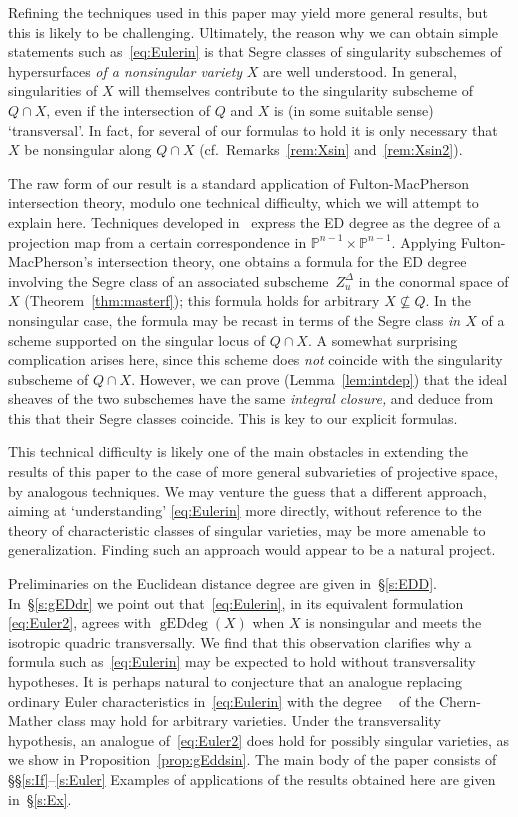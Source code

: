 \documentclass[11pt]{amsart}
\numberwithin{equation}{section}
\newcommand{\Pbb}{{\mathbb{P}}}
\DeclareMathOperator{\gEdd}{gEDdeg}
\DeclareMathOperator{\chima}{\chi_\text{Ma}}
\begin{document}
Refining the techniques used in this paper may yield more general results, but
this is likely to be challenging. Ultimately, the reason why we can obtain simple
statements such as~\eqref{eq:Eulerin} is that Segre classes of singularity subschemes
of hypersurfaces {\em of a nonsingular variety\/} $X$ are well understood. 
In general, singularities of $X$ will themselves contribute to the singularity subscheme 
of $Q\cap X$, even if the intersection of $Q$ and $X$ is (in some suitable sense) 
`transversal'. In fact, for several of our formulas to hold it is only necessary that $X$ 
be nonsingular along $Q\cap X$ (cf.~Remarks~\ref{rem:Xsin} and~\ref{rem:Xsin2}).

The raw form of our result is a standard application of Fulton-MacPherson
intersection theory, modulo one technical difficulty, which we will attempt to 
explain here. Techniques developed in~\cite{MR3451425} express the ED degree
as the degree of a projection map from a certain correspondence in $\Pbb^{n-1}
\times \Pbb^{n-1}$. Applying Fulton-MacPherson's intersection theory, one
obtains a formula for the ED degree involving the Segre class of  an associated 
subscheme~$Z^\Delta_u$ in the conormal space of $X$ (Theorem~\ref{thm:masterf});
this formula holds for arbitrary $X\not\subseteq Q$. In the nonsingular case, the
formula may be recast in terms of the Segre class {\em in $X$\/} of a scheme 
supported on the singular locus of $Q\cap X$. A somewhat surprising complication 
arises here, since this scheme does {\em not\/} coincide with the singularity 
subscheme of $Q\cap X$. However, we can prove (Lemma~\ref{lem:intdep}) 
that the ideal sheaves of the two subschemes have the same {\em integral closure,\/} 
and deduce from this that their Segre classes coincide. This is key to our explicit 
formulas.

This technical difficulty is likely one of the main obstacles in extending the results 
of this paper to the case of more general subvarieties of projective space, by 
analogous techniques. We may venture the guess that a different approach, aiming
at `understanding' \eqref{eq:Eulerin} more directly, without reference to the theory
of characteristic classes of singular varieties,
may be more amenable to generalization. Finding such an
approach would appear to be a natural project.

Preliminaries on the Euclidean distance degree are given in~\S\ref{s:EDD}. 
In~\S\ref{s:gEDdr} we point out that~\eqref{eq:Eulerin}, in its equivalent formulation
\eqref{eq:Euler2}, agrees with $\gEdd(X)$ when $X$ is nonsingular and
meets the isotropic quadric transversally. We find that this observation clarifies
why a formula such as~\eqref{eq:Eulerin} may be expected to hold without
transversality hypotheses. 
It is perhaps natural to conjecture that an analogue replacing ordinary Euler
characteristics in~\eqref{eq:Eulerin} with the degree $\chima$ of the Chern-Mather 
class may hold for arbitrary varieties. Under the transversality hypothesis, an analogue 
of~\eqref{eq:Euler2} does hold for possibly singular varieties, as we show in 
Proposition~\ref{prop:gEddsin}.
The main body of the paper consists of \S\S\ref{s:If}--\ref{s:Euler}
Examples of applications of the results obtained here are given in~\S\ref{s:Ex}.
\end{document}
